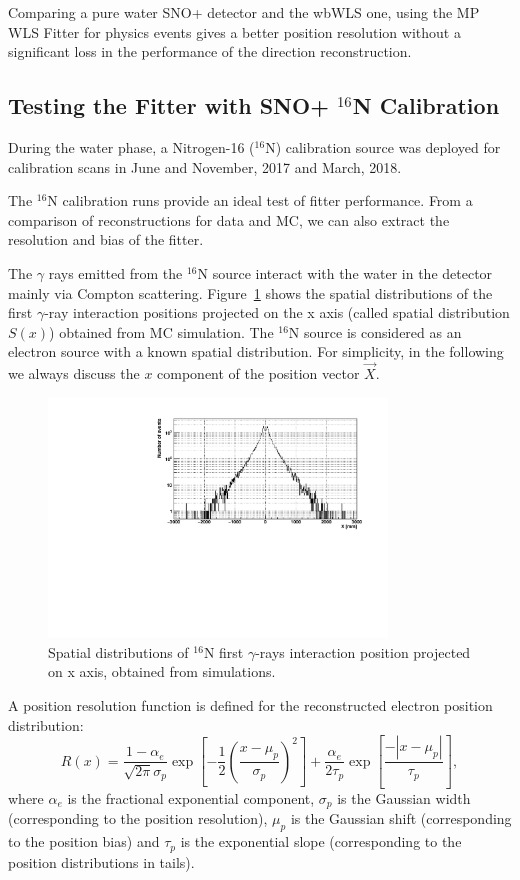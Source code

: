 \documentclass[preprint,12pt]{elsarticle}
\numberwithin{equation}{section}
\begin{document}
Comparing a pure water SNO+ detector and the wbWLS one, using the MP WLS Fitter for physics events gives a better position resolution without a significant loss in the performance of the direction reconstruction.

\subsection{Testing the Fitter with SNO+ $^{16}$N Calibration}
During the water phase, a Nitrogen-16 ($^{16}$N) calibration source was deployed for calibration scans in June and November, 2017 and March, 2018. 

The $^{16}$N calibration runs provide an ideal test of fitter performance. From a comparison of reconstructions for data and MC, we can also extract the resolution and bias of the fitter.

The $\gamma$ rays emitted from the $^{16}$N source interact with the water in the detector mainly via Compton scattering. Figure~\ref{hsx} shows the spatial distributions of the first $\gamma$-ray interaction positions projected on the x axis (called spatial distribution $S(x)$) obtained from MC simulation. The $^{16}$N source is considered as an electron source with a known spatial distribution\cite{boulay}. For simplicity, in the following we always discuss the $x$ component of the position vector $\vec{X}$. 

\begin{figure}[!htb]
	\centering
	\includegraphics[width=9cm]{sx.pdf}
	\caption{Spatial distributions of {$^{16}$}N first $\gamma$-rays interaction position projected on x axis, obtained from simulations.}
	\label{hsx}
\end{figure}

A position resolution function is defined for the reconstructed electron position distribution\cite{boulay}:
\[
  R(x)=\frac{1-\alpha_e}{\sqrt{2\pi}\sigma_p}\exp{[-\frac{1}{2}(\frac{x-\mu_p}{\sigma_p})^2]+\frac{\alpha_e}{2\tau_p}\exp{[\frac{-|x-\mu_p|}{\tau_p}]}},
\]
where $\alpha_e$ is the fractional exponential component, $\sigma_p$ is
the Gaussian width (corresponding to the position resolution), $\mu_p$ is the Gaussian shift  (corresponding to the position bias) and $\tau_p$ is the exponential slope (corresponding to the position distributions in tails).
\end{document}
